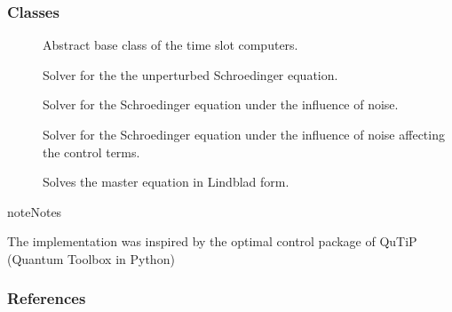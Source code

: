 \documentclass[letterpaper,10pt,english]{sphinxmanual}
\begin{document}
\subsubsection{Classes}
\label{\detokenize{qsim:id32}}\begin{description}
\item[{{\hyperref[\detokenize{qsim:qsim.solver_algorithms.Solver}]{}}}] \leavevmode
Abstract base class of the time slot computers.

\item[{{\hyperref[\detokenize{qsim:qsim.solver_algorithms.SchroedingerSolver}]{}}}] \leavevmode
Solver for the the unperturbed Schroedinger equation.

\item[{{\hyperref[\detokenize{qsim:qsim.solver_algorithms.SchroedingerSMonteCarlo}]{}}}] \leavevmode
Solver for the Schroedinger equation under the influence of noise.

\item[{{\hyperref[\detokenize{qsim:qsim.solver_algorithms.SchroedingerSMCControlNoise}]{}}}] \leavevmode
Solver for the Schroedinger equation under the influence of noise affecting
the control terms.

\item[{{\hyperref[\detokenize{qsim:qsim.solver_algorithms.LindbladSolver}]{}}}] \leavevmode
Solves the master equation in Lindblad form.

\end{description}

\begin{sphinxadmonition}{note}{Notes}

The implementation was inspired by the optimal control package of QuTiP 
(Quantum Toolbox in Python)
\end{sphinxadmonition}
\subsubsection*{References}
\end{document}
